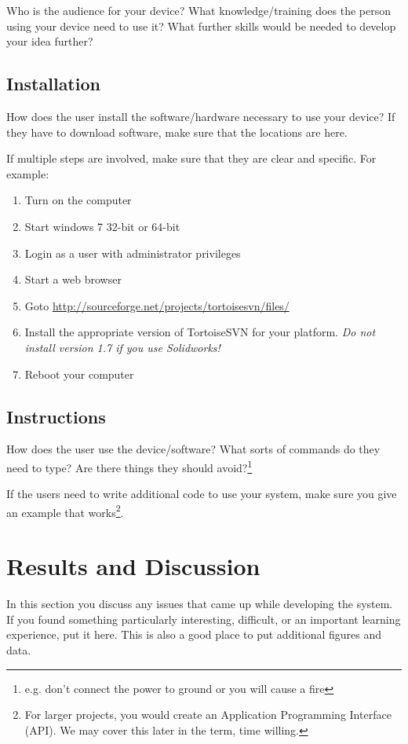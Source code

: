\documentclass[12pt, svn, draft]{rureport}
\begin{document}
Who is the audience for your device?  What knowledge/training does
the person using your device need to use
it?  What further skills would be needed to develop your idea further?

\subsection{Installation}
How does the user install the software/hardware necessary to use your
device?  If they have to download software, make sure that the
locations are here.

If multiple steps are involved, make sure that they are clear and specific.  For example:
\begin{enumerate}
\item Turn on the computer
\item Start windows 7 32-bit or 64-bit
\item Login as a user with administrator privileges
\item Start a web browser
\item Goto \url{http://sourceforge.net/projects/tortoisesvn/files/}
\item Install the appropriate version of TortoiseSVN for your platform.  {\em Do not install version 1.7 if you use Solidworks!}
\item Reboot your computer
\end{enumerate}

\subsection{Instructions}
How does the user use the device/software?  What sorts of commands do
they need to type?  Are there things they should
avoid?\footnote{e.g. don't connect the power to ground or you will
  cause a fire}

If the users need to write additional code to use your system, make
sure you give an example that works\footnote{For larger projects, you
  would create an Application Programming Interface (API).  We may
  cover this later in the term, time willing.}.

\section{Results and Discussion}
In this section you discuss any issues that came up while developing
the system.  If you found something particularly interesting,
difficult, or an important learning experience, put it here.  This is
also a good place to put additional figures and data.
\end{document}
